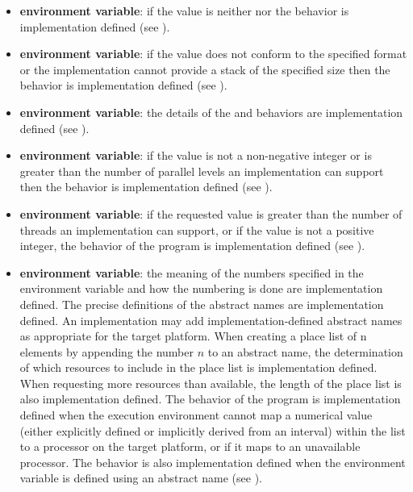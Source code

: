 \begin{itemize}
\item {} \textbf{environment variable}: if the value is neither 
 nor  the behavior is implementation defined (see 
).

\item {} \textbf{environment variable}: if the value does not conform to the 
specified format or the implementation cannot provide a stack of the specified size 
then the behavior is implementation defined (see ).

\item {} \textbf{environment variable}: the details of the  and 
 behaviors are implementation defined (see ).

\item {} \textbf{environment variable}: if the value is not a 
non-negative integer or is greater than the number of parallel levels an implementation 
can support then the behavior is implementation defined (see ).

\item {} \textbf{environment variable}: if the requested value is greater than 
the number of threads an implementation can support, or if the value is not a positive 
integer, the behavior of the program is implementation defined (see ).

\item {} \textbf{environment variable}: the meaning of the numbers specified in the 
environment variable and how the numbering is done are implementation defined. 
The precise definitions of the abstract names are implementation defined. An
implementation may add implementation-defined abstract names as appropriate for 
the target platform. When creating a place list of n elements by appending the 
number $n$ to an abstract name, the determination of which resources to include in the 
place list is implementation defined. When requesting more resources than available, 
the length of the place list is also implementation defined. The behavior of the 
program is implementation defined when the execution environment cannot map a 
numerical value (either explicitly defined or implicitly derived from an interval) 
within the  list to a processor on the target platform, or if it maps to an 
unavailable processor. The behavior is also implementation defined when the 
 environment variable is defined using an abstract name (see ).


\end{itemize}
